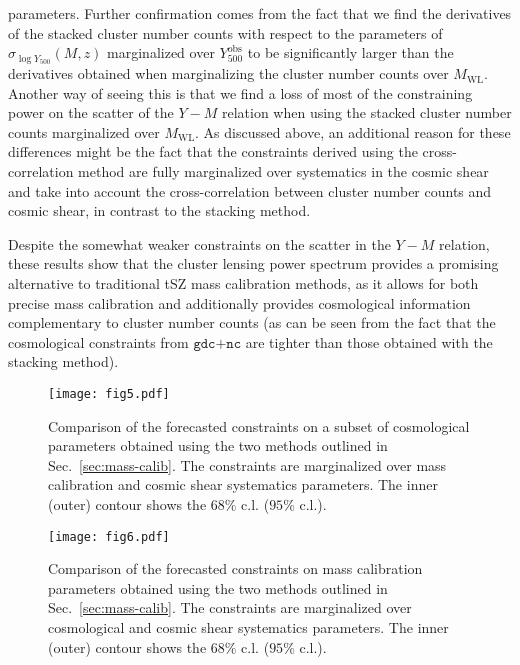 \documentclass[%
 reprint,
nofootinbib,
 amsmath,amssymb,
 aps,
]{revtex4-1}
\begin{document}
parameters. Further confirmation comes from the fact that we find the derivatives of the stacked cluster number counts with respect to the parameters of $\sigma_{\log Y_{500}}(M, z)$ marginalized over $Y^{\mathrm{obs}}_{500}$ to be significantly larger than the derivatives obtained when marginalizing the cluster number counts over $M_{\mathrm{WL}}$. Another way of seeing this is that we find a loss of most of the constraining power on the scatter of the $Y-M$ relation when using the stacked cluster number counts marginalized over $M_{\mathrm{WL}}$. As discussed above, an additional reason for these differences might be the fact that the constraints derived using the cross-correlation method are fully marginalized over systematics in the cosmic shear and take into account the cross-correlation between cluster number counts and cosmic shear, in contrast to the stacking method.

Despite the somewhat weaker constraints on the scatter in the $Y-M$ relation, these results show that the cluster lensing power spectrum provides a promising alternative to traditional tSZ mass calibration methods, as it allows for both precise mass calibration and additionally provides cosmological information complementary to cluster number counts (as can be seen from the fact that the cosmological constraints from $\texttt{gdc+nc}$ are tighter than those obtained with the stacking method). 

\begin{figure*}
\begin{center}
\texttt{[image: fig5.pdf]}
 \caption{Comparison of the forecasted constraints on a subset of cosmological parameters obtained using the two methods outlined in Sec.~\ref{sec:mass-calib}. The constraints are marginalized over mass calibration and cosmic shear systematics parameters. The inner (outer) contour shows the $68 \%$ c.l. ($95 \%$ c.l.).}
\label{fig:constraints-cosmo-cls-vs-stacking-H0-As-w0-wa}
\end{center}
\end{figure*}

\begin{figure*}
\begin{center}
\texttt{[image: fig6.pdf]}
 \caption{Comparison of the forecasted constraints on mass calibration parameters obtained using the two methods outlined in Sec.~\ref{sec:mass-calib}. The constraints are marginalized over cosmological and cosmic shear systematics parameters. The inner (outer) contour shows the $68 \%$ c.l. ($95 \%$ c.l.).}
\label{fig:constraints-Y-M-cls-vs-stacking}
\end{center}
\end{figure*}
\end{document}
